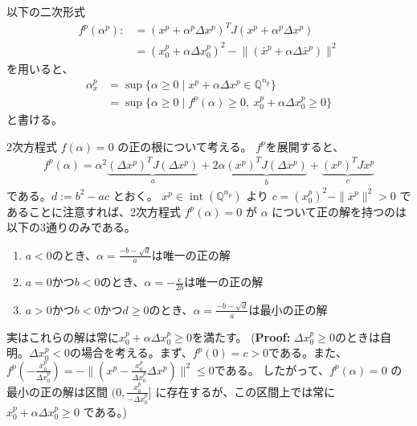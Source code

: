 \documentclass{jsarticle}
\begin{document}
以下の二次形式
\begin{align*}
  f^p(\alpha^p)
  :&= ( x^p + \alpha^p \Delta x^p )^T J ( x^p + \alpha^p \Delta x^p )\\
   &=  ( x^p_0 + \alpha \Delta x^p_0 )^2 - \bigl\|( \bar{x}^p + \alpha \Delta \bar{x}^p )\bigr\|^2
\end{align*}
を用いると、
\begin{align*}
    \alpha_x^p 
    &= \sup\{\alpha \geq 0 \mid x^p + \alpha \Delta x^p \in \mathbb{Q}^{n_p}\}\\
    &= \sup\{\alpha \geq 0 \mid f^p(\alpha) \geq 0, ~x^p_0 + \alpha \Delta x^p_0 \geq 0\}
\end{align*}
と書ける。

2次方程式 $f(\alpha)=0$ の正の根について考える。 %
$f^p$を展開すると、
\begin{align*}
    f^p(\alpha) = \alpha^2\underbrace{(\Delta x^p)^T J (\Delta x^p)}_a + 2 \alpha \underbrace{(x^p)^T J (\Delta x^p)}_b + \underbrace{(x^p)^T J x^p}_c
\end{align*}
である。$d:=b^2-ac$ とおく。
$x^p\in \operatorname{int}(\mathbb{Q}^{n_p})$ より $c = (x^p_0)^2 - \|\bar{x}^p\|^2 > 0$ であることに注意すれば、2次方程式 $f^p(\alpha) = 0$ が $\alpha$ について正の解を持つのは以下の3通りのみである。
\begin{enumerate}
    \item $a<0$のとき、$\alpha=\frac{-b-\sqrt{d}}{a}$は唯一の正の解
    \item $a=0$かつ$b<0$のとき、$\alpha=-\frac{c}{2b}$は唯一の正の解
    \item $a>0$かつ$b<0$かつ$d\geq 0$のとき、$\alpha=\frac{-b-\sqrt{d}}{a}$は最小の正の解
\end{enumerate}
実はこれらの解は常に$x^p_0+\alpha \Delta x^p_0\geq 0$を満たす。
(\textbf{Proof:} $\Delta x^p_0 \geq 0$のときは自明。$\Delta x^p_0 < 0$の場合を考える。まず、$f^p(0)=c>0$である。また、
$f^p(-\frac{x^p_0}{\Delta x^p_0}) = - \|(x^p -\frac{x^p_0}{\Delta x^p_0} \Delta x^p)\|^2 \leq 0$である。
したがって、$f^p(\alpha) = 0$ の最小の正の解は区間 $\big(0, \frac{x^p_0}{-\Delta x^p_0}\big]$ に存在するが、この区間上では常に $x^p_0+\alpha \Delta x^p_0\geq 0$ である。)
\end{document}
